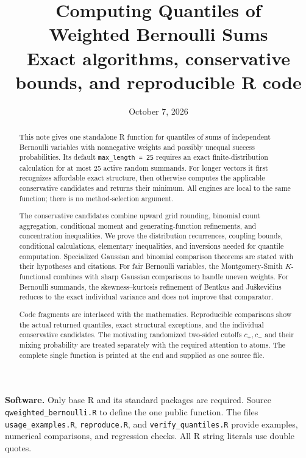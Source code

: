 \documentclass[11pt,letterpaper]{article}
\title{\vspace{-1.2em}\textbf{Computing Quantiles of\\Weighted Bernoulli Sums}\\[0.55em]
  \large Exact algorithms, conservative bounds, and reproducible R code}
\author{}
\date{October 7, 2026}
\numberwithin{equation}{section}
\theoremstyle{definition}
\theoremstyle{remark}
\begin{document}
\maketitle
\vspace{-1.6em}
\begin{abstract}
This note gives one standalone R function for quantiles of sums of
independent Bernoulli variables with nonnegative weights and possibly
unequal success probabilities. Its default \texttt{max\_length = 25}
requires an exact finite-distribution calculation for at most 25 active
random summands. For longer vectors it first recognizes affordable exact
structure, then otherwise computes the applicable conservative candidates
and returns their minimum. All engines are local to the same function;
there is no method-selection argument.

The conservative candidates combine upward grid rounding, binomial count
aggregation, conditional moment and generating-function refinements,
and concentration inequalities. We prove the distribution recurrences,
coupling bounds, conditional calculations, elementary inequalities, and
inversions needed for quantile computation. Specialized Gaussian and
binomial comparison theorems are stated with their hypotheses and citations.
For fair Bernoulli variables, the Montgomery-Smith $K$-functional combines
with sharp Gaussian comparisons to handle uneven weights. For Bernoulli
summands, the skewness--kurtosis refinement of Bentkus and Ju\v skevi\v cius
reduces to the exact individual variance and does not improve that comparator.

Code fragments are interlaced with the mathematics. Reproducible comparisons
show the actual returned quantiles, exact structural exceptions, and the
individual conservative candidates. The motivating randomized two-sided
cutoffs $c_+,c_-$ and their mixing probability are treated separately with
the required attention to atoms. The complete single function is printed
at the end and supplied as one source file.
\end{abstract}
\vspace{0.3em}
\noindent\textbf{Software.} Only base R and its standard packages are
required. Source \texttt{qweighted\_bernoulli.R} to define the one public
function. The files \texttt{usage\_examples.R}, \texttt{reproduce.R}, and
\texttt{verify\_quantiles.R} provide examples, numerical comparisons, and
regression checks. All R string literals use double quotes.
\clearpage
\begingroup
\fontsize{9.5}{11}\selectfont
\setlength{\parskip}{0pt}
\tableofcontents
\endgroup
\clearpage
\end{document}
